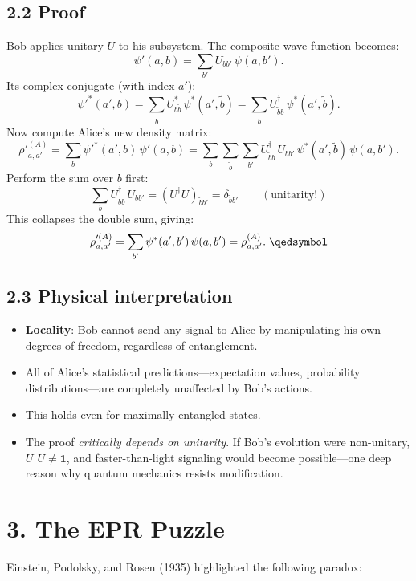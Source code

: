 \documentclass[12pt,a4paper]{article}
\begin{document}
\subsection{2.2 Proof}
Bob applies unitary $U$ to his subsystem.  The composite wave function becomes:
\[
    \psi'(a,b) = \sum_{b'} U_{bb'}\,\psi(a,b').
\]
Its complex conjugate (with index $a'$):
\[
    \psi'^*(a',b) = \sum_{\tilde{b}} U^*_{b\tilde{b}}\,\psi^*(a',\tilde{b}) = \sum_{\tilde{b}} U^\dagger_{\tilde{b}b}\,\psi^*(a',\tilde{b}).
\]
Now compute Alice's new density matrix:
\[
    \rho'^{(A)}_{a,a'} = \sum_b \psi'^*(a',b)\,\psi'(a,b)
    = \sum_b \sum_{\tilde{b}} \sum_{b'} U^\dagger_{\tilde{b}b}\,U_{bb'}\,\psi^*(a',\tilde{b})\,\psi(a,b').
\]
Perform the sum over $b$ first:
\[
    \sum_b U^\dagger_{\tilde{b}b}\,U_{bb'} = (U^\dagger U)_{\tilde{b}b'} = \delta_{\tilde{b}b'} \qquad (\text{unitarity!})
\]
This collapses the double sum, giving:
\[
    \rho'^{(A)}_{a,a'} = \sum_{b'} \psi^*(a',b')\,\psi(a,b') = \rho^{(A)}_{a,a'}.\;\qedsymbol
\]

\subsection{2.3 Physical interpretation}
\begin{itemize}[nosep]
    \item \textbf{Locality}: Bob cannot send any signal to Alice by manipulating his own degrees of freedom, regardless of entanglement.
    \item All of Alice's statistical predictions---expectation values, probability distributions---are completely unaffected by Bob's actions.
    \item This holds even for maximally entangled states.
    \item The proof \emph{critically depends on unitarity}.  If Bob's evolution were non-unitary, $U^\dagger U \neq \mathbf{1}$, and faster-than-light signaling would become possible---one deep reason why quantum mechanics resists modification.
\end{itemize}

\section{3. The EPR Puzzle}

Einstein, Podolsky, and Rosen (1935) highlighted the following paradox:
\end{document}
